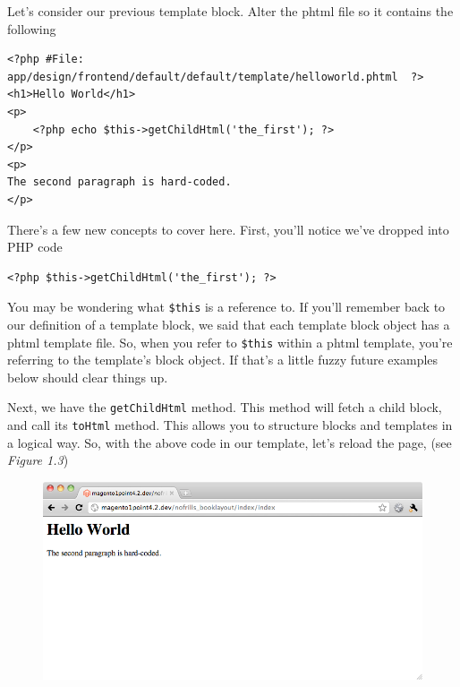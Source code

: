 \documentclass[oneside]{book}
\begin{document}
Let's consider our previous template block.  Alter the phtml file so it contains the following

\begin{lstlisting}
<?php #File: app/design/frontend/default/default/template/helloworld.phtml  ?>
<h1>Hello World</h1>
<p>
    <?php echo $this->getChildHtml('the_first'); ?>
</p>
<p>
The second paragraph is hard-coded.
</p>

\end{lstlisting}


There's a few new concepts to cover here.  First, you'll notice we've dropped into PHP code

\begin{lstlisting}
<?php $this->getChildHtml('the_first'); ?>

\end{lstlisting}


You may be wondering what \footnotesize\texttt{\$this} \normalsize  is a reference to.  If you'll remember back to our definition of a template block, we said that each template block object has a phtml template file.  So, when you refer to \footnotesize\texttt{\$this} \normalsize  within a phtml template, you're referring to the template's  block object.  If that's a little fuzzy future examples below should clear things up.

Next, we have the \footnotesize\texttt{getChildHtml} \normalsize  method.  This method will fetch a child block, and call its \footnotesize\texttt{toHtml} \normalsize  method.  This allows you to structure blocks and templates in a logical way. So, with the above code in our template, let's reload the page, (see \emph{Figure 1.3})

\begin{figure}[htb]
\begin{center}
\leavevmode
\includegraphics[width=1\textwidth]{images/chapter1/nofirst.png}
\end{center}
\caption{}
\end{figure}
\end{document}
